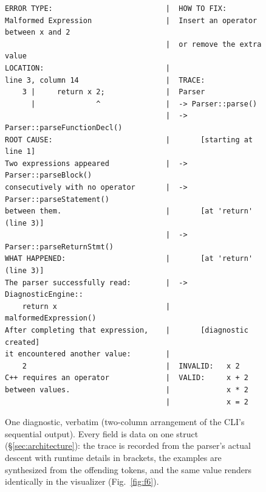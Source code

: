
\begin{figure}[t]
\begin{lstlisting}
ERROR TYPE:                          |  HOW TO FIX:
Malformed Expression                 |  Insert an operator between x and 2
                                     |  or remove the extra value
LOCATION:                            |
line 3, column 14                    |  TRACE:
    3 |     return x 2;              |  Parser
      |              ^               |  -> Parser::parse()
                                     |  -> Parser::parseFunctionDecl()
ROOT CAUSE:                          |       [starting at line 1]
Two expressions appeared             |  -> Parser::parseBlock()
consecutively with no operator       |  -> Parser::parseStatement()
between them.                        |       [at 'return' (line 3)]
                                     |  -> Parser::parseReturnStmt()
WHAT HAPPENED:                       |       [at 'return' (line 3)]
The parser successfully read:        |  -> DiagnosticEngine::
    return x                         |       malformedExpression()
After completing that expression,    |       [diagnostic created]
it encountered another value:        |
    2                                |  INVALID:   x 2
C++ requires an operator             |  VALID:     x + 2
between values.                      |             x * 2
                                     |             x = 2
\end{lstlisting}
\caption{One diagnostic, verbatim (two-column arrangement of the
CLI's sequential output). Every field is data on one struct
(\S\ref{sec:architecture}): the trace is recorded from the parser's
actual descent with runtime details in brackets, the examples are
synthesized from the offending tokens, and the same value renders
identically in the visualizer (Fig.~\ref{fig:f6}).}
\label{fig:f1}
\end{figure}


